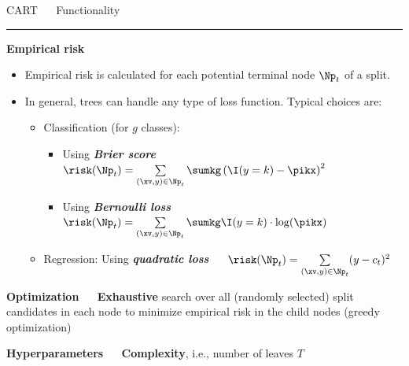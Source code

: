 \documentclass[11pt,compress,t,notes=noshow, xcolor=table]{beamer}
\begin{document}
\LARGE
\begin{frame}{\textcolor{gray!80}{CART} ~~ Functionality}
\normalsize
\vspace{-0.5cm}
\noindent \textcolor{gray!80}{\rule{\textwidth}{1pt}}

\vspace{0.3cm}

\footnotesize

\textbf{\textcolor{gray!80}{Empirical risk}} \\

\begin{itemize}
  \item Empirical risk is calculated for each potential terminal node $\Np_t$
  of a split.
  \item In general, trees can handle any type of loss function. Typical choices
  are:
  \begin{itemize}
    \footnotesize
    \item Classification (for $g$ classes):
    \begin{itemize}
      \footnotesize
      \item Using \textit{\textbf{Brier score}} ~~
      $\risk(\Np_t) = \sum\limits_{(\xv,y) \in \Np_t} \sumkg \left( \I(y = k)
      - \pikx \right)^2$
      \item Using \textit{\textbf{Bernoulli loss}} ~~
      $\risk(\Np_t) = \sum\limits_{(\xv,y) \in \Np_t} \sumkg \I(y = k) \cdot
      \log(\pikx)$
    \end{itemize}
    \item Regression: Using \textit{\textbf{quadratic loss}} ~~
    $\risk(\Np_t) = \sum\limits_{(\xv,y) \in \Np_t} (y - c_t)^2$
  \end{itemize}
\end{itemize}

\medskip

\textbf{\textcolor{gray!80}{Optimization}} ~~ \textbf{Exhaustive} search over
all (randomly selected) split candidates in each node to minimize empirical risk 
in the child nodes (greedy optimization) \\

\medskip

\textbf{\textcolor{gray!80}{Hyperparameters}} ~~ \textbf{Complexity}, i.e., 
number of leaves $T$ \\

\normalsize
  
\end{frame}

\end{document}
